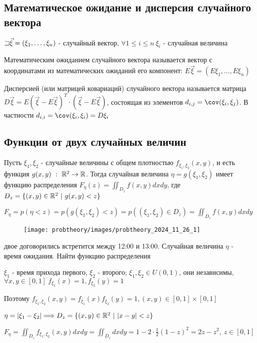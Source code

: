 \documentclass[12pt]{article}
\begin{document}
    \subsection{Математическое ожидание и дисперсия случайного вектора}
    
    $\mathord{\sqsupset} \vec{\xi} = (\xi_1, \dots, \xi_n)$ - случайный вектор, 
    $\forall 1 \leq i \leq n \ \xi_i$ - случайная величина

    \Def Математическим ожиданием случайного вектора называется вектор с координатами 
    из математических ожиданий его компонент: $E\vec{\xi} = (E\xi_1, \dots, E\xi_n)$

    \Def Дисперсией (или матрицей ковариаций) случайного вектора называется матрица
    $D\vec{\xi} = E(\vec{\xi} - E\vec{\xi})^T \cdot (\vec{\xi} - E\vec{\xi})$, состоящая
    из элементов $d_{i, j} = \cov (\xi_i, \xi_j)$. В частности $d_{i, i} = \cov (\xi_i, \xi_i) = D\xi_i$

    \subsection{Функции от двух случайных величин}

    \begin{MyTheorem}
        \Ths Пусть $\xi_1, \xi_2$ - случайные величины с общем плотностью $f_{\xi_1, \xi_2}(x, y)$, и есть функция
        $g(x, y) \ : \ \mathbb{R}^2 \rightarrow \mathbb{R}$. Тогда случайная величина $\eta = g(\xi_1, \xi_2)$ имеет
        функцию распределения $F_{\eta}(z) = \iint_{D_z} f(x, y)dxdy$, 
        где $D_z = \{(x, y) \in \mathbb{R}^2 \ | \ g(x, y) < z\}$
    \end{MyTheorem}

    \begin{MyProof}
        $F_\eta = p(\eta < z) = p(g(\xi_1, \xi_2) < z) = p((\xi_1, \xi_2) \in D_z) = \iint_{D_z} f(x, y) dxdy$
    \end{MyProof}

    \begin{minipage}{\textwidth}
        \begin{wrapfigure}{r}{0pt}
            \texttt{[image: probtheory/images/probtheory\_2024\_11\_26\_1]}
        \end{wrapfigure}

         двое договорились встретится между 12:00 и 13:00. Случайная величина $\eta$ - 
        время ожидания. Найти функцию распределения

        $\xi_1$ - время прихода первого, $\xi_2$ - второго; $\xi_1, \xi_2 \in U(0, 1)$, они независимы, 
        $\forall x, y \in [0, 1] \ f_{\xi_1}(x) = 1, f_{\xi_2}(y) = 1$

        Поэтому $f_{\xi_1, \xi_2}(x, y) = f_{\xi_1}(x) f_{\xi_2}(y) = 1, (x, y) \in [0, 1] \times [0, 1]$

        $\eta = |\xi_1 - \xi_2| \Longrightarrow D_z = \{(x, y) \in \mathbb{R}^2 \ | \ |x - y| < z\}$

        $F_\eta = \iint_{D_z} f_{\xi_1, \xi_2}(x, y) dxdy = \iint_{D_z} dxdy = 1 - 2 \cdot \frac{1}{2} (1 - z)^2 = 
        2z - z^2, \ z \in [0, 1]$
    \end{minipage}
\end{document}
